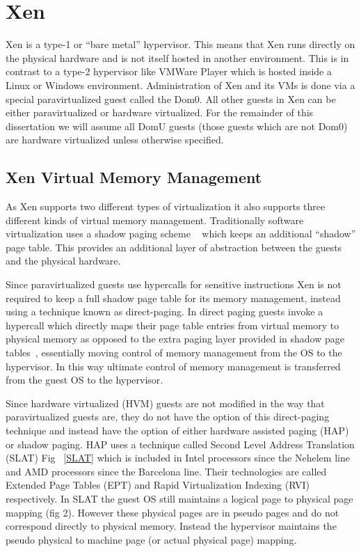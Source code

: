 \section{Xen}
Xen is a type-1 or ``bare metal'' hypervisor. This means that Xen runs directly on the physical hardware and is not itself hosted in another environment. This is in contrast to a type-2 hypervisor like VMWare Player which is hosted inside a Linux or Windows environment. Administration of Xen and its VMs is done via a special paravirtualized guest called the Dom0. All other guests in Xen can be either paravirtualized or hardware virtualized. For the remainder of this dissertation we will assume all DomU guests (those guests which are not Dom0) are hardware virtualized unless otherwise specified.

\subsection{Xen Virtual Memory Management}

As Xen supports two different types of virtualization it also supports three different kinds of virtual memory management. Traditionally software virtualization uses a shadow paging scheme ~\cite{barham_xen_2003} which keeps an additional ``shadow'' page table. This provides an additional layer of abstraction between the guests and the physical hardware. 

Since paravirtualized guests use hypercalls for sensitive instructions Xen is not required to keep a full shadow page table for its memory management, instead using a technique known as direct-paging. In direct paging guests invoke a hypercall which directly maps their page table entries from virtual memory to physical memory as opposed to the extra paging layer provided in shadow page tables~\cite{barham_xen_2003},  essentially moving control of memory management from the OS to the hypervisor. In this way ultimate control of memory management is transferred from the guest OS to the hypervisor. 


Since hardware virtualized (HVM) guests are not modified in the way that paravirtualized guests are, they do not have the option of this direct-paging technique and instead have the option of either hardware assisted paging (HAP) or shadow paging. HAP uses a technique called Second Level Address Translation (SLAT) Fig ~\ref{SLAT} which is included in Intel processors since the Nehelem line and AMD processors since the Barcelona line. Their technologies are called Extended Page Tables (EPT) and Rapid Virtualization Indexing (RVI) respectively. In SLAT the guest OS still maintains a logical page to physical page mapping (fig 2). However these physical pages are in pseudo pages and do not correspond directly to physical memory. Instead the hypervisor maintains the pseudo physical to machine page (or actual physical page) mapping.  


